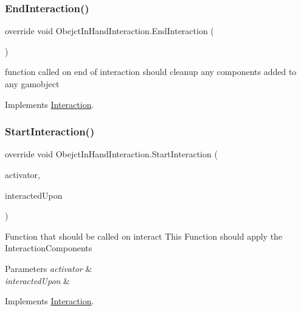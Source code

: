 \subsubsection{\texorpdfstring{End\+Interaction()}{EndInteraction()}}
{\footnotesize\ttfamily override void Obejct\+In\+Hand\+Interaction.\+End\+Interaction (\begin{DoxyParamCaption}{ }\end{DoxyParamCaption})\hspace{0.3cm}{\ttfamily [virtual]}}



function called on end of interaction should cleanup any components added to any gamobject 



Implements \mbox{\hyperlink{class_interaction_a13c7d99dbecf8e0d61973fd23de6400c}{Interaction}}.

\mbox{\label{class_obejct_in_hand_interaction_a9046df053628946f7ce5f4e484097482}} 
\subsubsection{\texorpdfstring{Start\+Interaction()}{StartInteraction()}}
{\footnotesize\ttfamily override void Obejct\+In\+Hand\+Interaction.\+Start\+Interaction (\begin{DoxyParamCaption}\item[{Game\+Object}]{activator,  }\item[{Game\+Object}]{interacted\+Upon }\end{DoxyParamCaption})\hspace{0.3cm}{\ttfamily [virtual]}}



Function that should be called on interact This Function should apply the Interaction\+Components 


\begin{DoxyParams}{Parameters}
{\em activator} & \\
\hline
{\em interacted\+Upon} & \\
\hline
\end{DoxyParams}


Implements \mbox{\hyperlink{class_interaction_afa5031e1db8f7c23cf26c896937e69f9}{Interaction}}.

